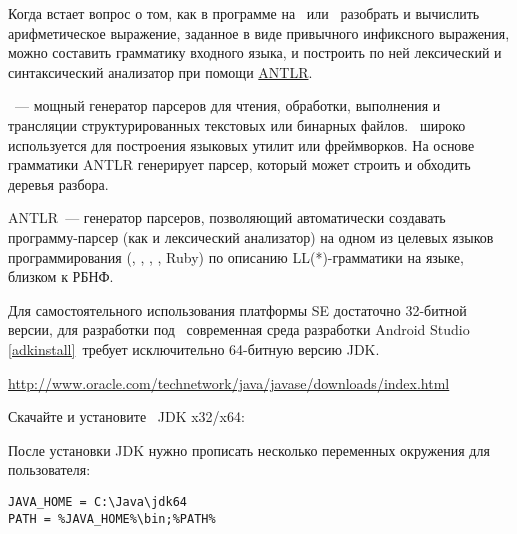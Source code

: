 \secdown


Когда встает вопрос о том, как в программе на \java\ или \cs\ разобрать и 
вычислить арифметическое выражение, заданное в
виде привычного инфиксного выражения, можно составить грамматику 
входного языка, и построить по ней лексический и синтаксический 
анализатор при помощи \href{http://www.antlr.org/}{ANTLR}.

\begin{framed}
\ --- мощный генератор
парсеров для чтения, обработки, выполнения и трансляции
структурированных текстовых или бинарных файлов. \ широко 
используется для построения языковых утилит или фреймворков. На основе 
грамматики ANTLR генерирует парсер, который может строить и обходить 
деревья разбора.
\end{framed}

ANTLR\ --- генератор парсеров, позволяющий автоматически создавать
программу-парсер (как и лексический анализатор) на одном из целевых языков
программирования (\cpp, \java, \cs, \py, Ruby) по описанию LL(*)-грамматики 
на языке, близком к РБНФ.

\secdown


Для самостоятельного использования платформы \java SE достаточно
32-битной версии, для разработки под \andr\ современная среда разработки Android 
Studio \ref{adkinstall}\ требует исключительно 64-битную версию JDK.

\bigskip
\url{http://www.oracle.com/technetwork/java/javase/downloads/index.html}
\bigskip

Скачайте и установите \java\ JDK x32/x64:





\bigskip
После установки JDK нужно прописать несколько переменных окружения для 
пользователя:

\begin{verbatim}
JAVA_HOME = C:\Java\jdk64
PATH = %JAVA_HOME%\bin;%PATH%
\end{verbatim}

